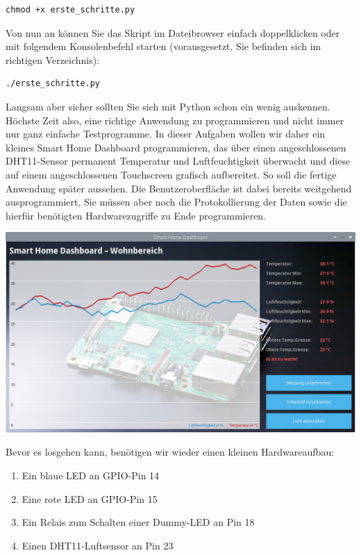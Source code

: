 \begin{Verbatim}[gobble=4]
    chmod +x erste_schritte.py
\end{Verbatim}

Von nun an können Sie das Skript im Dateibrowser einfach doppelklicken oder
mit folgendem Konsolenbefehl starten (vorausgesetzt, Sie befinden sich im
richtigen Verzeichnis):

\begin{Verbatim}[gobble=4]
    ./erste_schritte.py
\end{Verbatim}

\clearpage

\teilaufgabe
Langsam aber sicher sollten Sie sich mit Python schon ein wenig auskennen.
Höchste Zeit also, eine richtige Anwendung zu programmieren und nicht immer nur
ganz einfache Testprogramme. In dieser Aufgaben wollen wir daher ein kleines
Smart Home Dashboard programmieren, das über einen angeschlossenen DHT11-Sensor
permanent Temperatur und Luftfeuchtigkeit überwacht und diese auf einem
angeschlossenen Touchscreen grafisch aufbereitet. So soll die fertige Anwendung
später aussehen. Die Benutzeroberfläche ist dabei bereits weitgehend
ausprogrammiert, Sie müssen aber noch die Protokollierung der Daten sowie die
hierfür benötigten Hardwarezugriffe zu Ende programmieren.

\includegraphics[width=\textwidth]{img/aufgabe-dashboard}

Bevor es losgehen kann, benötigen wir wieder einen kleinen Hardwareaufbau:

\begin{enumerate}
    \item Ein blaue LED an GPIO-Pin 14
    \item Eine rote LED an GPIO-Pin 15
    \item Ein Relais zum Schalten einer Dummy-LED an Pin 18
    \item Einen DHT11-Luftsensor an Pin 23
\end{enumerate}

